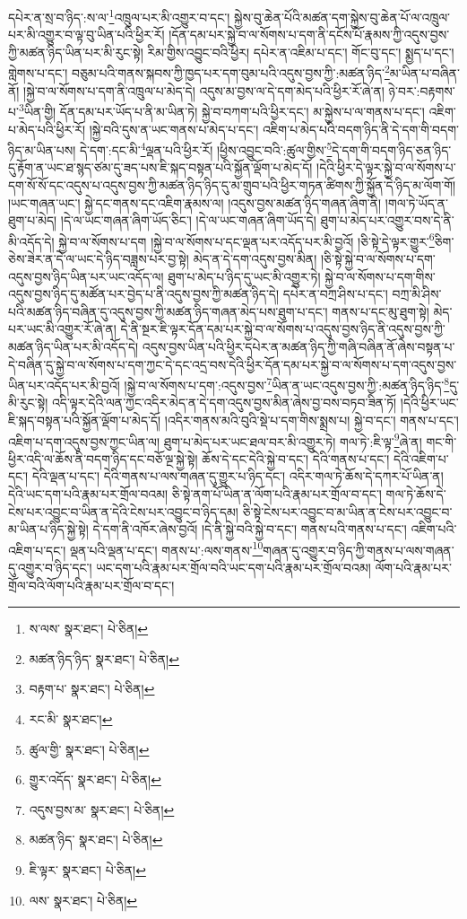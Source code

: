 དཔེར་ན་སྲ་བ་ཉིད་:ས་ལ་\footnote{ས་ལས་  སྣར་ཐང་།  པེ་ཅིན། }འཁྲུལ་པར་མི་འགྱུར་བ་དང་། སྐྱེས་བུ་ཆེན་པོའི་མཚན་དག་སྐྱེས་བུ་ཆེན་པོ་ལ་འཁྲུལ་པར་མི་འགྱུར་བ་ལྟ་བུ་ཡིན་པའི་ཕྱིར་རོ། །དོན་དམ་པར་སྐྱེ་བ་ལ་སོགས་པ་དག་ནི་དངོས་པོ་རྣམས་ཀྱི་འདུས་བྱས་ཀྱི་མཚན་ཉིད་ཡིན་པར་མི་རུང་སྟེ། རིམ་གྱིས་འབྱུང་བའི་ཕྱིར། དཔེར་ན་འཇིམ་པ་དང་། གོང་བུ་དང་། སྨྱད་པ་དང་། གླེགས་པ་དང་། བཅུམ་པའི་གནས་སྐབས་ཀྱི་ཁྱད་པར་དག་བུམ་པའི་འདུས་བྱས་ཀྱི་:མཚན་ཉིད་\footnote{མཚན་ཉིད་ཉིད་  སྣར་ཐང་།  པེ་ཅིན། }མ་ཡིན་པ་བཞིན་ནོ། །སྐྱེ་བ་ལ་སོགས་པ་དག་ནི་འཁྲུལ་པ་མེད་དེ། འདུས་མ་བྱས་ལ་དེ་དག་མེད་པའི་ཕྱིར་རོ་ཞེ་ན། ཉེ་བར་:བརྟགས་པ་\footnote{བརྟག་པ་  སྣར་ཐང་།  པེ་ཅིན། }ཡིན་གྱི། དོན་དམ་པར་ཡོད་པ་ནི་མ་ཡིན་ཏེ། སྐྱེ་བ་བཀག་པའི་ཕྱིར་དང་། མ་སྐྱེས་པ་ལ་གནས་པ་དང་། འཇིག་པ་མེད་པའི་ཕྱིར་རོ། །སྐྱེ་བའི་དུས་ན་ཡང་གནས་པ་མེད་པ་དང་། འཇིག་པ་མེད་པའི་བདག་ཉིད་ནི་དེ་དག་གི་བདག་ཉིད་མ་ཡིན་པས། དེ་དག་:དང་མི་\footnote{རང་མི་  སྣར་ཐང་། }ལྡན་པའི་ཕྱིར་རོ། །ཕྱིས་འབྱུང་བའི་:ཚུལ་གྱིས་\footnote{ཚུལ་གྱི་  སྣར་ཐང་།  པེ་ཅིན། }དེ་དག་གི་བདག་ཉིད་ཅན་ཉིད་དུ་རྟོག་ན་ཡང་ཐ་སྙད་ཙམ་དུ་ཟད་པས་ཇི་སྐད་བསྟན་པའི་སྐྱོན་ལྡོག་པ་མེད་དོ། །དེའི་ཕྱིར་དེ་ལྟར་སྐྱེ་བ་ལ་སོགས་པ་དག་སོ་སོ་དང་འདུས་པ་འདུས་བྱས་ཀྱི་མཚན་ཉིད་ཉིད་དུ་མ་གྲུབ་པའི་ཕྱིར་གཏན་ཚིགས་ཀྱི་སྐྱོན་དེ་ཉིད་མ་ལོག་གོ། །ཡང་གཞན་ཡང་། སྐྱེ་དང་གནས་དང་འཇིག་རྣམས་ལ། །འདུས་བྱས་མཚན་ཉིད་གཞན་ཞིག་ནི། །གལ་ཏེ་ཡོད་ན་ཐུག་པ་མེད། །དེ་ལ་ཡང་གཞན་ཞིག་ཡོད་ཅིང་། །དེ་ལ་ཡང་གཞན་ཞིག་ཡོད་དེ། ཐུག་པ་མེད་པར་འགྱུར་བས་དེ་ནི་མི་འདོད་དེ། སྐྱེ་བ་ལ་སོགས་པ་དག །སྐྱེ་བ་ལ་སོགས་པ་དང་ལྡན་པར་འདོད་པར་མི་བྱའོ། །ཅི་སྟེ་དེ་ལྟར་གྱུར་\footnote{གྱུར་འདོད་  སྣར་ཐང་།  པེ་ཅིན། }ཅིག་ཅེས་ཟེར་ན་དེ་ལ་ཡང་དེ་ཉིད་བཟླས་པར་བྱ་སྟེ། མེད་ན་དེ་དག་འདུས་བྱས་མིན། །ཅི་སྟེ་སྐྱེ་བ་ལ་སོགས་པ་དག་འདུས་བྱས་ཉིད་ཡིན་པར་ཡང་འདོད་ལ། ཐུག་པ་མེད་པ་ཉིད་དུ་ཡང་མི་འགྱུར་ཏེ། སྐྱེ་བ་ལ་སོགས་པ་དག་གིས་འདུས་བྱས་ཉིད་དུ་མཚོན་པར་བྱེད་པ་ནི་འདུས་བྱས་ཀྱི་མཚན་ཉིད་དེ། དཔེར་ན་བཀྲ་ཤིས་པ་དང་། བཀྲ་མི་ཤིས་པའི་མཚན་ཉིད་བཞིན་དུ་འདུས་བྱས་ཀྱི་མཚན་ཉིད་གཞན་མེད་པས་ཐུག་པ་དང་། གནས་པ་དང་མུ་ཐུག་སྟེ། མེད་པར་ཡང་མི་འགྱུར་རོ་ཞེ་ན། དེ་ནི་སྔར་ཇི་ལྟར་དོན་དམ་པར་སྐྱེ་བ་ལ་སོགས་པ་འདུས་བྱས་ཉིད་ནི་འདུས་བྱས་ཀྱི་མཚན་ཉིད་ཡིན་པར་མི་འདོད་དེ། འདུས་བྱས་ཡིན་པའི་ཕྱིར་དཔེར་ན་མཚན་ཉིད་ཀྱི་གཞི་བཞིན་ནོ་ཞེས་བསྟན་པ་དེ་བཞིན་དུ་སྐྱེ་བ་ལ་སོགས་པ་དག་ཀྱང་དེ་དང་འདྲ་བས་དེའི་ཕྱིར་དོན་དམ་པར་སྐྱེ་བ་ལ་སོགས་པ་དག་འདུས་བྱས་ཡིན་པར་འདོད་པར་མི་བྱའོ། །སྐྱེ་བ་ལ་སོགས་པ་དག་:འདུས་བྱས་\footnote{འདུས་བྱས་མ་  སྣར་ཐང་།  པེ་ཅིན། }ཡིན་ན་ཡང་འདུས་བྱས་ཀྱི་:མཚན་ཉིད་ཉིད་\footnote{མཚན་ཉིད་  སྣར་ཐང་།  པེ་ཅིན། }དུ་མི་རུང་སྟེ། འདི་ལྟར་དེའི་ལན་ཀྱང་འདིར་མེད་ན་དེ་དག་འདུས་བྱས་མིན་ཞེས་བྱ་བས་བཏབ་ཟིན་ཏོ། །དེའི་ཕྱིར་ཡང་ཇི་སྐད་བསྟན་པའི་སྐྱོན་ལྡོག་པ་མེད་དོ། །འདིར་གནས་མའི་བུའི་སྡེ་པ་དག་གིས་སྨྲས་པ། སྐྱེ་བ་དང་། གནས་པ་དང་། འཇིག་པ་དག་འདུས་བྱས་ཀྱང་ཡིན་ལ། ཐུག་པ་མེད་པར་ཡང་ཐལ་བར་མི་འགྱུར་ཏེ། གལ་ཏེ་:ཇི་ལྟ་\footnote{ཇི་ལྟར་  སྣར་ཐང་།  པེ་ཅིན། }ཞེ་ན། གང་གི་ཕྱིར་འདི་ལ་ཆོས་ནི་བདག་ཉིད་དང་བཅོ་ལྔ་སྐྱེ་སྟེ། ཆོས་དེ་དང་དེའི་སྐྱེ་བ་དང་། དེའི་གནས་པ་དང་། དེའི་འཇིག་པ་དང་། དེའི་ལྡན་པ་དང་། དེའི་གནས་པ་ལས་གཞན་དུ་གྱུར་པ་ཉིད་དང་། འདིར་གལ་ཏེ་ཆོས་དེ་དཀར་པོ་ཡིན་ན། དེའི་ཡང་དག་པའི་རྣམ་པར་གྲོལ་བའམ། ཅི་སྟེ་ནག་པོ་ཡིན་ན་ལོག་པའི་རྣམ་པར་གྲོལ་བ་དང་། གལ་ཏེ་ཆོས་དེ་ངེས་པར་འབྱུང་བ་ཡིན་ན་དེའི་ངེས་པར་འབྱུང་བ་ཉིད་དམ། ཅི་སྟེ་ངེས་པར་འབྱུང་བ་མ་ཡིན་ན་ངེས་པར་འབྱུང་བ་མ་ཡིན་པ་ཉིད་སྐྱེ་སྟེ། དེ་དག་ནི་འཁོར་ཞེས་བྱའོ། །དེ་ནི་སྐྱེ་བའི་སྐྱེ་བ་དང་། གནས་པའི་གནས་པ་དང་། འཇིག་པའི་འཇིག་པ་དང་། ལྡན་པའི་ལྡན་པ་དང་། གནས་པ་:ལས་གནས་\footnote{ལས་  སྣར་ཐང་།  པེ་ཅིན། }གཞན་དུ་འགྱུར་བ་ཉིད་ཀྱི་གནས་པ་ལས་གཞན་དུ་འགྱུར་བ་ཉིད་དང་། ཡང་དག་པའི་རྣམ་པར་གྲོལ་བའི་ཡང་དག་པའི་རྣམ་པར་གྲོལ་བའམ། ལོག་པའི་རྣམ་པར་གྲོལ་བའི་ལོག་པའི་རྣམ་པར་གྲོལ་བ་དང་། 
